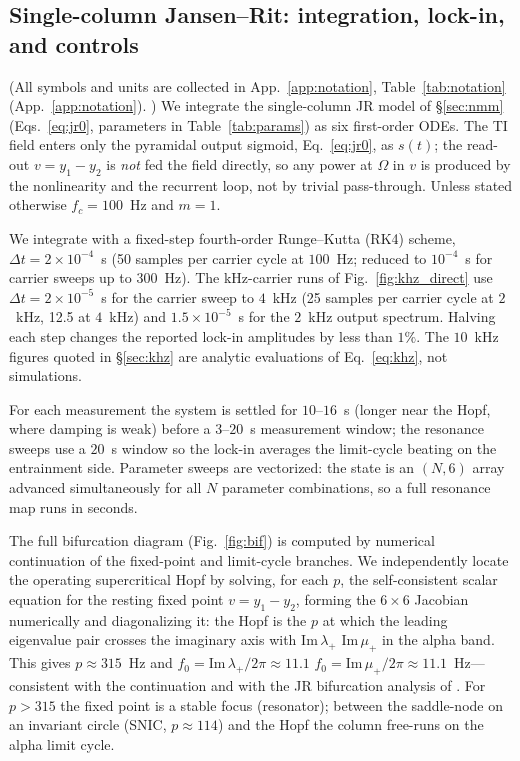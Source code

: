 \documentclass[11pt,a4paper]{article}
\providecommand{\DIFaddtex}[1]{{\protect\color{blue} \sf #1}} %
\providecommand{\DIFdeltex}[1]{{\protect\color{red} \scriptsize #1}} %
\providecommand{\DIFaddbegin}{} %
\providecommand{\DIFaddend}{} %
\providecommand{\DIFdelbegin}{} %
\providecommand{\DIFdelend}{} %
\providecommand{\DIFadd}[1]{\texorpdfstring{\DIFaddtex{#1}}{#1}} %
\providecommand{\DIFdel}[1]{\texorpdfstring{\DIFdeltex{#1}}{}} %
\begin{document}
\subsection{Single-column Jansen--Rit: integration, lock-in, and controls}
\DIFdelbegin \DIFdel{(}\DIFdelend All symbols and units are collected in \DIFdelbegin \DIFdel{App.~\ref{app:notation},
}\DIFdelend Table~\ref{tab:notation}
\DIFaddbegin \DIFadd{(App.~\ref{app:notation})}\DIFaddend . \DIFdelbegin \DIFdel{) }\DIFdelend We integrate the single-column JR model of \S\ref{sec:nmm}
(Eqs.~\eqref{eq:jr0}, parameters in Table~\ref{tab:params}) as six first-order
ODEs. The TI field enters only the pyramidal output sigmoid, Eq.~\eqref{eq:jr0},
as $s(t)$; the read-out $v=y_1-y_2$ is \emph{not} fed the field directly, so any
power at $\Omega$ in $v$ is produced by the nonlinearity and the recurrent loop,
not by trivial pass-through. Unless stated otherwise $f_c=100$~Hz and $m=1$.

We integrate with a fixed-step fourth-order Runge--Kutta \DIFaddbegin \DIFadd{(RK4) }\DIFaddend scheme,
$\Delta t=2\times10^{-4}$~s (50 samples per carrier cycle at $100$~Hz; reduced to
$10^{-4}$~s for carrier sweeps up to $300$~Hz). The kHz-carrier runs of
Fig.~\ref{fig:khz_direct} use $\Delta t=2\times10^{-5}$~s for the carrier sweep to
$4$~kHz (25 samples per carrier cycle at $2$~kHz, 12.5 at $4$~kHz) and
$1.5\times10^{-5}$~s for the $2$~kHz output spectrum. Halving each step changes the
reported lock-in amplitudes by less than $1\%$. The $10$~kHz figures quoted in
\S\ref{sec:khz} are analytic evaluations of Eq.~\eqref{eq:khz}, not simulations.
\DIFaddbegin 

\DIFaddend For each measurement the system is settled for $10$--$16$~s (longer near the Hopf, where damping is weak) before a
$3$--$20$~s measurement window; the resonance sweeps use a $20$~s window so the
lock-in averages the limit-cycle beating on the entrainment side. Parameter
sweeps are vectorized: the state is an
$(N,6)$ array advanced simultaneously for all $N$ parameter combinations, so a full
resonance map runs in seconds.
\DIFaddbegin 

\DIFaddend The full bifurcation diagram (Fig.~\ref{fig:bif}) is computed by numerical continuation of
the fixed-point and limit-cycle branches. We independently locate the operating
supercritical Hopf by solving, for each $p$, the self-consistent scalar equation for the
resting fixed point $v=y_1-y_2$, forming the $6\times6$ Jacobian numerically and
diagonalizing it: the Hopf is the $p$ at which the leading eigenvalue pair crosses the
imaginary axis with \DIFdelbegin \DIFdel{$\mathrm{Im}\,\lambda_+$ }\DIFdelend \DIFaddbegin \DIFadd{$\mathrm{Im}\,\mu_+$ }\DIFaddend in the alpha band. This gives $p\approx315$~Hz
and \DIFdelbegin \DIFdel{$f_0=\mathrm{Im}\,\lambda_+/2\pi\approx11.1$}\DIFdelend \DIFaddbegin \DIFadd{$f_0=\mathrm{Im}\,\mu_+/2\pi\approx11.1$}\DIFaddend ~Hz---consistent with the continuation and
with the JR bifurcation analysis of \cite{grimbert2006}. For $p>315$ the fixed point is a
stable focus (resonator); between the saddle-node on an invariant circle (SNIC,
$p\!\approx\!114$) and the Hopf the column free-runs on the alpha limit cycle.
\end{document}
